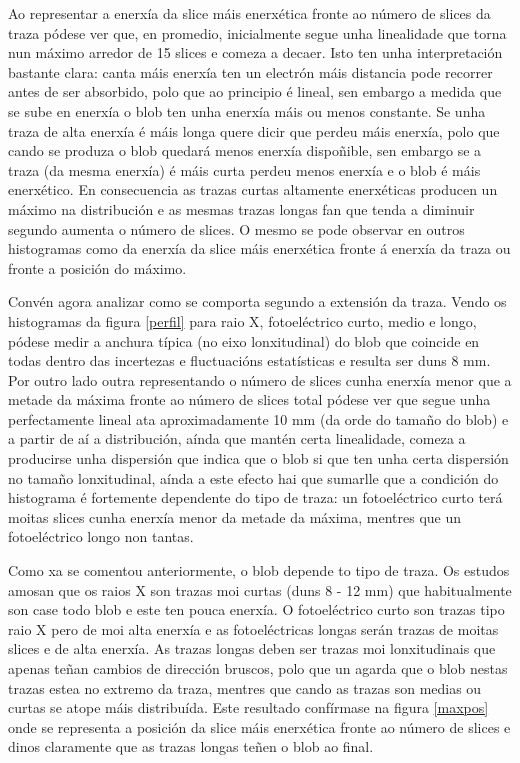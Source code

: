 \documentclass[a4paper,12pt]{article}
\begin{document}
Ao representar a enerxía da slice máis enerxética fronte ao número de slices da traza pódese ver que, en promedio, inicialmente segue unha linealidade que torna nun máximo arredor de 15 slices e comeza a decaer. Isto ten unha interpretación bastante clara: canta máis enerxía ten un electrón máis distancia pode recorrer antes de ser absorbido, polo que ao principio é lineal, sen embargo a medida que se sube en enerxía o blob ten unha enerxía máis ou menos constante. Se unha traza de alta enerxía é máis longa quere dicir que perdeu máis enerxía, polo que cando se produza o blob quedará menos enerxía dispoñible, sen embargo se a traza (da mesma enerxía) é máis curta perdeu menos enerxía e o blob é máis enerxético. En consecuencia as trazas curtas altamente enerxéticas producen un máximo na distribución e as mesmas trazas longas fan que tenda a diminuir segundo aumenta o número de slices. O mesmo se pode observar en outros histogramas como da enerxía da slice máis enerxética fronte á enerxía da traza ou fronte a posición do máximo.

Convén agora analizar como se comporta segundo a extensión da traza. Vendo os histogramas da figura \ref{perfil} para raio X, fotoeléctrico curto, medio e longo, pódese medir a anchura típica (no eixo lonxitudinal) do blob que coincide en todas dentro das incertezas e fluctuacións estatísticas  e resulta ser duns 8 mm. Por outro lado outra representando o número de slices cunha enerxía menor que a metade da máxima fronte ao número de slices total pódese ver que segue unha perfectamente lineal ata aproximadamente 10 mm (da orde do tamaño do blob) e a partir de aí a distribución, aínda que mantén certa linealidade, comeza a producirse unha dispersión que indica que o blob si que ten unha certa dispersión no tamaño lonxitudinal, aínda a este efecto hai que sumarlle que a condición do histograma é fortemente dependente do tipo de traza: un fotoeléctrico curto terá moitas slices cunha enerxía menor da metade da máxima, mentres que un fotoeléctrico longo non tantas.

Como xa se comentou anteriormente, o blob depende to tipo de traza. Os estudos amosan que os raios X son trazas moi curtas (duns 8 - 12 mm) que habitualmente son case todo blob e este ten pouca enerxía. O fotoeléctrico curto son trazas tipo raio X pero de moi alta enerxía e as fotoeléctricas longas serán trazas de moitas slices e de alta enerxía. As trazas longas deben ser trazas moi lonxitudinais que apenas teñan cambios de dirección bruscos, polo que un agarda que o blob nestas trazas estea no extremo da traza, mentres que cando as trazas son medias ou curtas se atope máis distribuída. Este resultado confírmase na figura \ref{maxpos} onde se representa a posición da slice máis enerxética fronte ao número de slices e dinos claramente que as trazas longas teñen o blob ao final.
\end{document}
